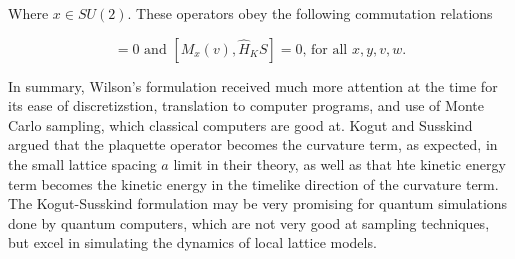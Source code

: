 \noindent Where $x \in SU(2)$. These operators obey the following commutation relations 

\begin{equation}
[M_x (v), M_y (w)] = 0 \text{ and } [M_x (v), \hat{H}_KS] = 0 \text{, for all } x, y, v, w.
\end{equation}

\noindent In summary, Wilson's formulation received much more attention at the time for its ease of discretizstion, translation to computer programs, and use of Monte Carlo sampling, which classical computers are good at. Kogut and Susskind argued that the plaquette operator becomes the curvature term, as expected, in the small lattice spacing $a$ limit in their theory, as well as that hte kinetic energy term becomes the kinetic energy in the timelike direction of the curvature term. The Kogut-Susskind formulation may be very promising for quantum simulations done by quantum computers, which are not very good at sampling techniques, but excel in simulating the dynamics of local lattice models.